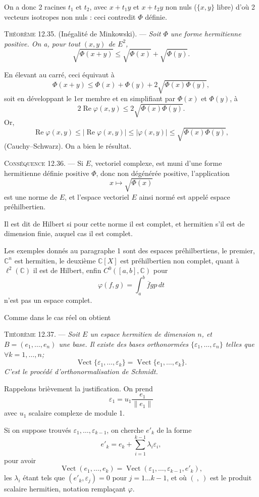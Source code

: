 On a donc 2 racines $t_1$ et $t_2$, avec $x+t_1y$ et $x+t_2y$ non nuls ($\{x,y\}$ libre) d'où 2 vecteurs isotropes non nuls : ceci contredit $\Phi$ définie. \bookend

\medskip\noindent\textsc{Théorème 12.35.} (Inégalité de Minkowski). --- \emph{Soit $\Phi$ une forme hermitienne positive. On a, pour tout $(x,y)$ de $E^2$,
\[
\sqrt{\Phi(x+y)}\le\sqrt{\Phi(x)}+\sqrt{\Phi(y)}.
\]}

En élevant au carré, ceci équivaut à
\[
\Phi(x+y)\le\Phi(x)+\Phi(y)+2\sqrt{\Phi(x)\Phi(y)},
\]
soit en développant le 1er membre et en simplifiant par $\Phi(x)$ et $\Phi(y)$, à
\[
2\operatorname{Re}\varphi(x,y)\le2\sqrt{\Phi(x)\Phi(y)}.
\]
Or,
\[
\operatorname{Re}\varphi(x,y)\le|\operatorname{Re}\varphi(x,y)|\le|\varphi(x,y)|\le\sqrt{\Phi(x)\Phi(y)},
\]
(Cauchy--Schwarz). On a bien le résultat. \bookend

\medskip\noindent\textsc{Conséquence 12.36.} --- Si $E$, vectoriel complexe, est muni d'une forme hermitienne définie positive $\Phi$, donc non dégénérée positive, l'application
\[
x\longmapsto\sqrt{\Phi(x)}
\]
est une norme de $E$, et l'espace vectoriel $E$ ainsi normé est appelé espace préhilbertien.

Il est dit de Hilbert si pour cette norme il est complet, et hermitien s'il est de dimension finie, auquel cas il est complet.

Les exemples donnés au paragraphe 1 sont des espaces préhilbertiens, le premier, $\mathbb C^n$ est hermitien, le deuxième $\mathbb C[X]$ est préhilbertien non complet, quant à $\ell^2(\mathbb C)$ il est de Hilbert, enfin $C^0([a,b],\mathbb C)$ pour
\[
\varphi(f,g)=\int_a^b\overline f gp\,dt
\]
n'est pas un espace complet.

Comme dans le cas réel on obtient

\medskip\noindent\textsc{Théorème 12.37.} --- \emph{Soit $E$ un espace hermitien de dimension $n$, et $B=(e_1,\ldots,e_n)$ une base. Il existe des bases orthonormées $\{\varepsilon_1,\ldots,\varepsilon_n\}$ telles que $\forall k=1,\ldots,n$;
\[
\operatorname{Vect}\{\varepsilon_1,\ldots,\varepsilon_k\}
=\operatorname{Vect}\{e_1,\ldots,e_k\}.
\]
C'est le procédé d'orthonormalisation de Schmidt.}

Rappelons brièvement la justification. On prend
\[
\varepsilon_1=u_1\frac{e_1}{\|e_1\|}
\]
avec $u_1$ scalaire complexe de module 1.

Si on suppose trouvés $\varepsilon_1,\ldots,\varepsilon_{k-1}$, on cherche $e'_k$ de la forme
\[
e'_k=e_k+\sum_{i=1}^{k-1}\lambda_i\varepsilon_i,
\]
pour avoir
\[
\operatorname{Vect}(e_1,\ldots,e_k)=\operatorname{Vect}(\varepsilon_1,\ldots,\varepsilon_{k-1},e'_k),
\]
les $\lambda_i$ étant tels que $(e'_k,\varepsilon_j)=0$ pour $j=1\ldots k-1$, et où $(\ ,\ )$ est le produit scalaire hermitien, notation remplaçant $\varphi$.

